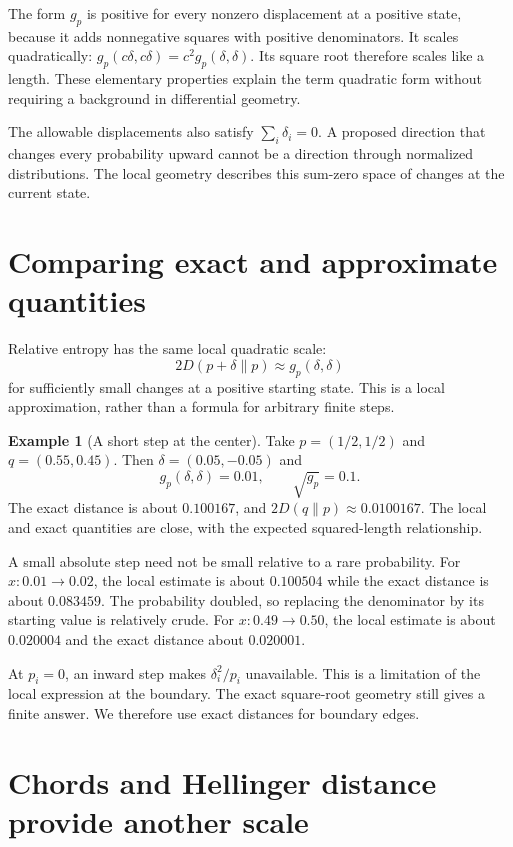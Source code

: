 \documentclass[11pt,oneside,openany]{book}
\theoremstyle{definition}
\newtheorem{example}{Example}[chapter]
\theoremstyle{remark}
\numberwithin{equation}{chapter}
\begin{document}
The form \(g_p\) is positive for every nonzero displacement at a positive state, because it adds nonnegative squares with positive denominators. It scales quadratically: \(g_p(c\delta,c\delta)=c^2g_p(\delta,\delta)\). Its square root therefore scales like a length. These elementary properties explain the term quadratic form without requiring a background in differential geometry.

The allowable displacements also satisfy \(\sum_i\delta_i=0\). A proposed direction that changes every probability upward cannot be a direction through normalized distributions. The local geometry describes this sum-zero space of changes at the current state.

\section{Comparing exact and approximate quantities}\label{ch07-comparing-exact-and-approximate-quantities}

Relative entropy has the same local quadratic scale: \[2D(p+\delta\|p)\approx g_p(\delta,\delta)\] for sufficiently small changes at a positive starting state. This is a local approximation, rather than a formula for arbitrary finite steps.

\begin{example}[A short step at the center]

Take \(p=(1/2,1/2)\) and \(q=(0.55,0.45)\). Then \(\delta=(0.05,-0.05)\) and \[g_p(\delta,\delta)=0.01,\qquad \sqrt{g_p}=0.1.\] The exact distance is about \(0.100167\), and \(2D(q\|p)\approx0.0100167\). The local and exact quantities are close, with the expected squared-length relationship.

\end{example}

A small absolute step need not be small relative to a rare probability. For \(x:0.01\to0.02\), the local estimate is about \(0.100504\) while the exact distance is about \(0.083459\). The probability doubled, so replacing the denominator by its starting value is relatively crude. For \(x:0.49\to0.50\), the local estimate is about \(0.020004\) and the exact distance about \(0.020001\).

At \(p_i=0\), an inward step makes \(\delta_i^2/p_i\) unavailable. This is a limitation of the local expression at the boundary. The exact square-root geometry still gives a finite answer. We therefore use exact distances for boundary edges.

\section{Chords and Hellinger distance provide another scale}\label{ch07-chords-and-hellinger-distance-provide-another-scale}
\end{document}
